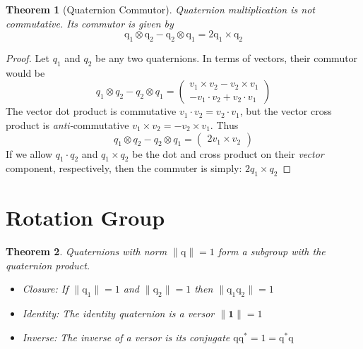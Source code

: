\documentclass{amsart}
\newtheorem{theorem}{Theorem}[section]
\theoremstyle{definition}
\theoremstyle{remark}
\numberwithin{equation}{section}
\begin{document}
\begin{theorem}[Quaternion Commutor]
  Quaternion multiplication is not commutative. Its commutor is given by
  \begin{equation}
    \mathrm{q}_1\otimes\mathrm{q}_2 - \mathrm{q}_2 \otimes \mathrm{q}_1 = 2 \mathrm{q}_1 \times \mathrm{q}_2
  \end{equation}
\end{theorem}
\begin{proof}
  Let $q_1$ and $q_2$ be any two quaternions. In terms of vectors, their commutor would be
  \begin{equation}
    q_1\otimes q_2-q_2\otimes q_1
    =
    \begin{pmatrix}
      v_1 \times v_2 - v_2 \times v_1 \\
      -v_1\cdot v_2 +v_2\cdot v_1
    \end{pmatrix}
  \end{equation}
  The vector dot product is commutative $v_1\cdot v_2 = v_2\cdot v_1$, but the vector cross product is \emph{anti-}commutative $v_1\times v_2 = -v_2 \times v_1$. Thus
  \begin{equation}
    q_1\otimes q_2-q_2\otimes q_1 =
    \begin{pmatrix}
      2v_1\times v_2
    \end{pmatrix}
  \end{equation}
  If we allow $q_1\cdot q_2$ and $q_1\times q_2$ be the dot and cross product on their \emph{vector} component, respectively, then the commuter is simply: $2q_1\times q_2$
\end{proof}


\section{Rotation Group}

\begin{theorem}
  Quaternions with norm $\|\mathrm{q}\|=1$ form a subgroup with the quaternion product.
	\begin{itemize}
	\item Closure: If $\|\mathrm{q}_1\|=1$ and $\|\mathrm{q}_2\|=1$ then $\|\mathrm{q}_1\mathrm{q}_2\|=1$
	\item Identity: The identity quaternion is a versor $\|\mathbf{1}\|=1$
	\item Inverse: The inverse of a versor is its conjugate $\mathrm{q}\mathrm{q}^*=1=\mathrm{q}^*\mathrm{q}$
	\end{itemize}
\end{theorem}
\end{document}
